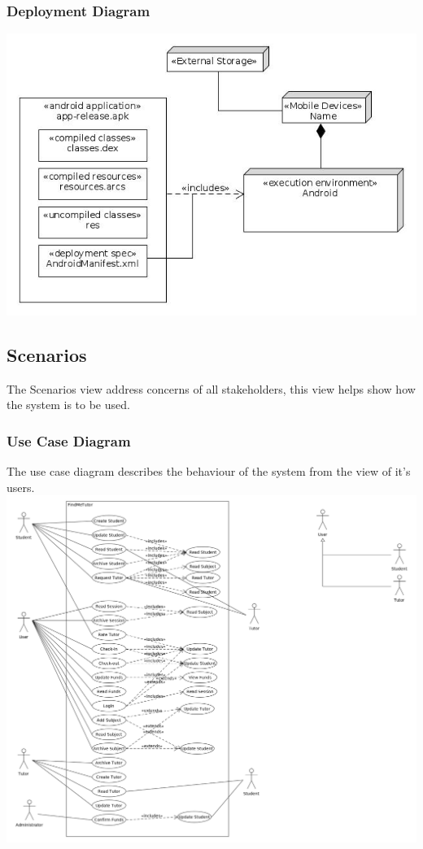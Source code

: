 \documentclass[12pt]{article}
\begin{document}
\subsubsection{Deployment Diagram}

\includegraphics[width=140mm]{./Deployment.jpg}

\subsection{Scenarios}
The Scenarios view address concerns of all stakeholders, this view helps show how the system is to be used.
\subsubsection{Use Case Diagram}
The use case diagram describes the behaviour of the system from the view of it's users.\\
\includegraphics[width=140mm]{./Use_Case_Diagram.png}
\end{document}
